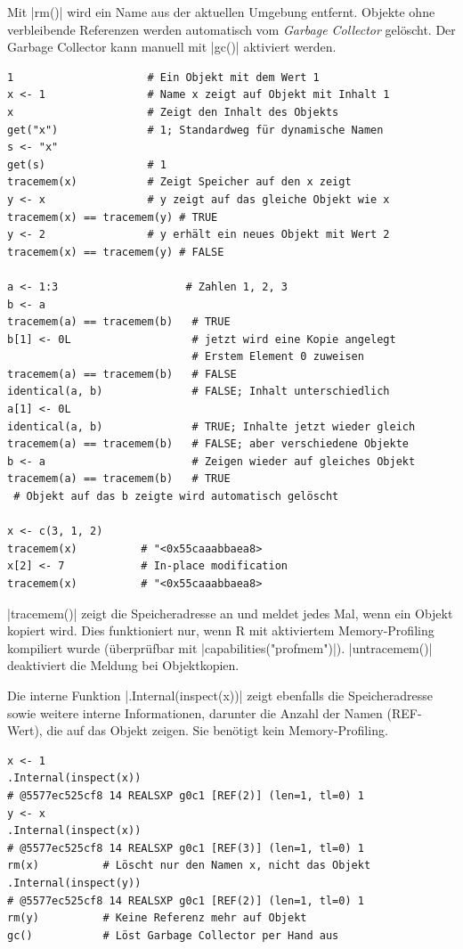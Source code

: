 \documentclass[10pt,twocolumn]{scrartcl}
\renewcommand{\lstinline}{\mycoloredinline}
\begin{document}
Mit \lstinline|rm()| wird ein Name aus der aktuellen Umgebung entfernt. Objekte ohne verbleibende Referenzen werden automatisch vom \emph{Garbage Collector} gelöscht. Der Garbage Collector kann manuell mit \lstinline|gc()| aktiviert werden.

\begin{lstlisting}
1                     # Ein Objekt mit dem Wert 1
x <- 1                # Name x zeigt auf Objekt mit Inhalt 1
x                     # Zeigt den Inhalt des Objekts
get("x")              # 1; Standardweg für dynamische Namen
s <- "x"
get(s)                # 1
tracemem(x)           # Zeigt Speicher auf den x zeigt
y <- x                # y zeigt auf das gleiche Objekt wie x
tracemem(x) == tracemem(y) # TRUE
y <- 2                # y erhält ein neues Objekt mit Wert 2
tracemem(x) == tracemem(y) # FALSE

a <- 1:3                    # Zahlen 1, 2, 3
b <- a
tracemem(a) == tracemem(b)   # TRUE
b[1] <- 0L                   # jetzt wird eine Kopie angelegt
                             # Erstem Element 0 zuweisen
tracemem(a) == tracemem(b)   # FALSE
identical(a, b)              # FALSE; Inhalt unterschiedlich
a[1] <- 0L
identical(a, b)              # TRUE; Inhalte jetzt wieder gleich
tracemem(a) == tracemem(b)   # FALSE; aber verschiedene Objekte
b <- a                       # Zeigen wieder auf gleiches Objekt
tracemem(a) == tracemem(b)   # TRUE
 # Objekt auf das b zeigte wird automatisch gelöscht

x <- c(3, 1, 2)
tracemem(x)          # "<0x55caaabbaea8>
x[2] <- 7            # In-place modification
tracemem(x)          # "<0x55caaabbaea8>
\end{lstlisting}

\lstinline|tracemem()| zeigt die Speicheradresse an und meldet jedes Mal, wenn ein Objekt kopiert wird. Dies funktioniert nur, wenn R mit aktiviertem Memory-Profiling kompiliert wurde (überprüfbar mit \lstinline|capabilities("profmem")|). \lstinline|untracemem()| deaktiviert die Meldung bei Objektkopien.

Die interne Funktion \lstinline|.Internal(inspect(x))| zeigt ebenfalls die Speicheradresse sowie weitere interne Informationen, darunter die Anzahl der Namen (REF-Wert), die auf das Objekt zeigen. Sie benötigt kein Memory-Profiling.

\begin{lstlisting}
x <- 1
.Internal(inspect(x))
# @5577ec525cf8 14 REALSXP g0c1 [REF(2)] (len=1, tl=0) 1
y <- x
.Internal(inspect(x))
# @5577ec525cf8 14 REALSXP g0c1 [REF(3)] (len=1, tl=0) 1
rm(x)          # Löscht nur den Namen x, nicht das Objekt
.Internal(inspect(y))
# @5577ec525cf8 14 REALSXP g0c1 [REF(2)] (len=1, tl=0) 1
rm(y)          # Keine Referenz mehr auf Objekt
gc()           # Löst Garbage Collector per Hand aus
\end{lstlisting}
\end{document}

